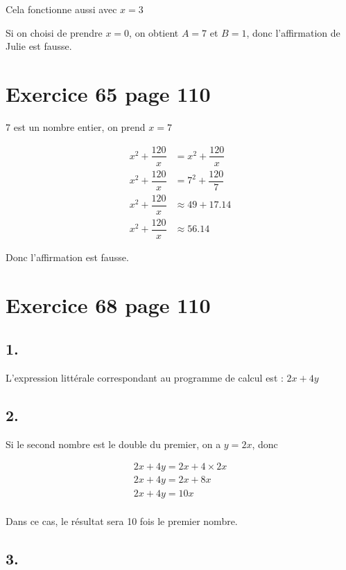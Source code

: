 \documentclass[12pt,a4paper]{article}
\begin{document}
Cela fonctionne aussi avec $x=3$

Si on choisi de prendre $x=0$, on obtient $A=7$ et $B=1$, donc l'affirmation de Julie est fausse.

\section*{Exercice 65 page 110}

7 est un nombre entier, on prend $x=7$

\begin{align*}
	x^2 + \dfrac{120}{x} &= x^2 + \dfrac{120}{x} \\
	x^2 + \dfrac{120}{x} &= 7^2 + \dfrac{120}{7} \\
	x^2 + \dfrac{120}{x} &\approx 49 + \num{17.14} \\
	x^2 + \dfrac{120}{x} &\approx \num{56.14}
\end{align*}

Donc l'affirmation est fausse.

\section*{Exercice 68 page 110}


\subsection*{1.}

L'expression littérale correspondant au programme de calcul est  : $ 2x + 4y$

\subsection*{2.}
Si le second nombre est le double du premier, on a $y=2x$, donc

\begin{align*}
 2x + 4y = 2x + 4 \times 2x \\
 2x + 4y = 2x + 8x \\
 2x + 4y = 10x \\
\end{align*}

Dans ce cas, le résultat sera 10 fois le premier nombre.

\subsection*{3.}
\end{document}
